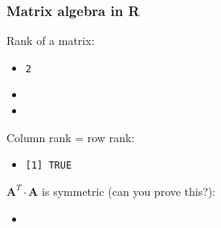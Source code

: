 \begin{frame}[containsverbatim]
  \frametitle{Matrix algebra in R}
  
  Rank of a matrix:
  \begin{itemize}
  \item {}
    \begin{footnotesize}
\begin{verbatim}
2
\end{verbatim}
    \end{footnotesize}
  \item {}
  \item {}
  \end{itemize}
  
  \gap
  Column rank = row rank:
  \begin{itemize}
  \item {}
    \begin{footnotesize}
\begin{verbatim}
[1] TRUE
\end{verbatim}
    \end{footnotesize}
  \end{itemize}

  \gap
  $\mathbf{A}^T\cdot \mathbf{A}$ is symmetric (can you prove this?):
  \begin{itemize}
  \item {}
  \end{itemize}
\end{frame}

